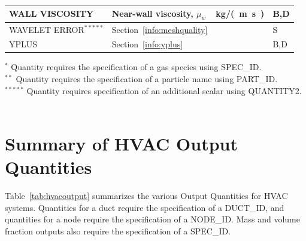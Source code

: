 \documentclass[11pt]{book}
\begin{document}
\begin{longtable}{@{\extracolsep{\fill}}|l|l|l|l|}
{\ct WALL VISCOSITY}                            & Near-wall viscosity, $\mu_w$                      & \si{kg/(m.s)}  & B,D          \\ \hline
{\ct WAVELET ERROR}$^{*****}$                   & Section~\ref{info:meshquality}                    &                & S            \\ \hline
{\ct YPLUS}                                     & Section~\ref{info:yplus}                          &                & B,D          \\ \hline
\end{longtable}

\noindent
\begin{tabbing}
$^{*}$  \hspace{0.25in} \= Quantity requires the specification of a gas species using {\ct SPEC\_ID}. \\
$^{**}$                \> Quantity requires the specification of a particle name using {\ct PART\_ID}. \\
$^{*****}$ \hspace{0.25in} \=  Quantity requires specification of an additional scalar using {\ct QUANTITY2}. \
\end{tabbing}

\clearpage
\section{Summary of HVAC Output Quantities}
\label{info:hvacoutputquantities}

Table~\ref{tab:hvacoutput} summarizes the various Output Quantities for HVAC systems.  Quantities for a duct require the specification
of a {\ct DUCT\_ID}, and quantities for a node require the specification of a {\ct NODE\_ID}.  Mass and volume fraction outputs also require the specification of a {\ct SPEC\_ID}.
\end{document}
